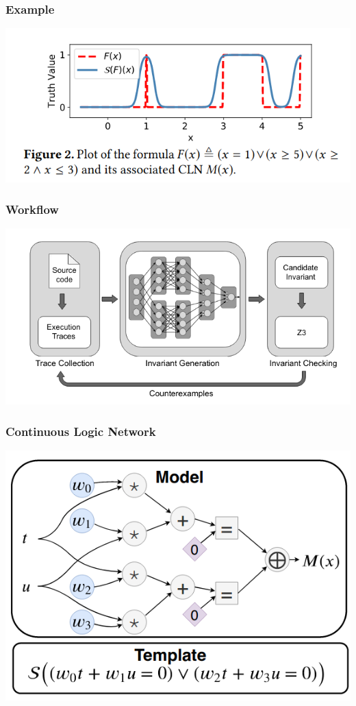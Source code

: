 \documentclass[11pt]{beamer}
\begin{document}
\begin{frame}\frametitle{Example}
\begin{center}
\includegraphics[scale=0.5]{4.png}
\end{center}
\end{frame}
\begin{frame}\frametitle{Workflow}
\begin{center}
\includegraphics[scale=0.45]{5.png}
\end{center}


\end{frame}

\begin{frame}\frametitle{Continuous Logic Network}
\begin{example}
\begin{center}
\includegraphics[scale=0.4]{1.png}
\end{center}
\end{example}
\end{frame}
\end{document}
